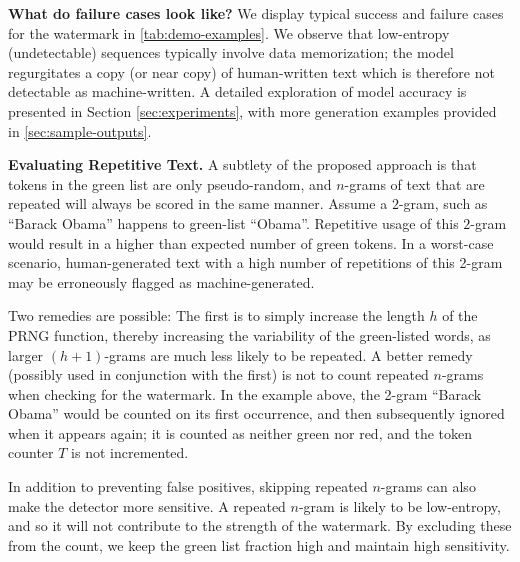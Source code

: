 \documentclass{article}
\theoremstyle{plain}
\theoremstyle{definition}
\theoremstyle{remark}
\begin{document}
\textbf{What do failure cases look like?} We display typical success and failure cases for the watermark in \cref{tab:demo-examples}.  We observe that low-entropy (undetectable) sequences typically involve data memorization; the model regurgitates a copy (or near copy) of human-written text which is therefore not detectable as machine-written. A detailed exploration of model accuracy is presented in Section \ref{sec:experiments}, with more generation examples provided in \cref{sec:sample-outputs}.

\textbf{Evaluating Repetitive Text.}
A subtlety of the proposed approach is that tokens in the green list are only pseudo-random, and $n$-grams of text that are repeated will always be scored in the same manner.
Assume a $2$-gram, such as ``Barack Obama'' happens to green-list ``Obama''. Repetitive usage of this $2$-gram would result in a higher than expected number of green tokens.
In a worst-case scenario, human-generated text with a high number of repetitions of this 2-gram may be erroneously flagged as machine-generated. 

 Two remedies are possible: The first is to simply increase the length $h$ of the PRNG function, thereby increasing the variability of the green-listed words, as larger $(h+1)$-grams are much less likely to be repeated. A better remedy (possibly used in conjunction with the first) is not to count repeated $n$-grams when checking for the watermark. In the example above, the 2-gram ``Barack Obama'' would be counted on its first occurrence, and then subsequently ignored when it appears again; it is counted as neither green nor red, and the token counter $T$ is not incremented.

In addition to preventing false positives, skipping repeated $n$-grams can also make the detector more sensitive. A repeated $n$-gram is likely to be low-entropy, and so it will not contribute to the strength of the watermark.  By excluding these from the count, we keep the green list fraction high and maintain high sensitivity.
\end{document}

